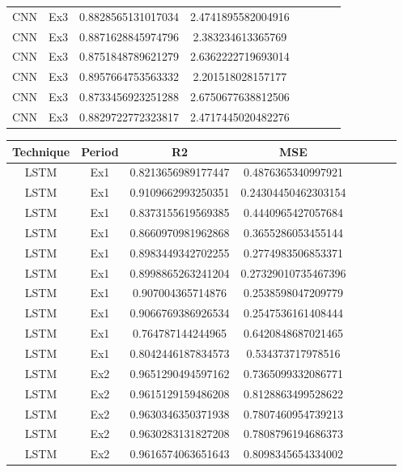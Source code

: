 \begin{appendices}
\begin{table}[H]
\begin{longtable}{ccccccll}
CNN & Ex3 & 0.8828565131017034 & 2.4741895582004916 \\
CNN & Ex3 & 0.8871628845974796 & 2.383234613365769 \\
CNN & Ex3 & 0.8751848789621279 & 2.6362222719693014 \\
CNN & Ex3 & 0.8957664753563332 & 2.201518028157177 \\
CNN & Ex3 & 0.8733456923251288 & 2.6750677638812506 \\
CNN & Ex3 & 0.8829722772323817 & 2.4717445020482276 \\ \hline
\end{longtable}
\end{table}


\thispagestyle{empty}


\begin{table}[H]
\scriptsize
\setlength\extrarowheight{3pt}
\centering
\caption{Resultados numéricos de todos os experimentos para os testes com o LSTM. Ações PETR4.SA.}
\begin{longtable}{ccccccll}
\hline
Technique & Period & R2 & MSE \\ \hline
\hline
LSTM & Ex1 & 0.8213656989177447 & 0.4876365340997921 \\
LSTM & Ex1 & 0.9109662993250351 & 0.24304450462303154 \\
LSTM & Ex1 & 0.8373155619569385 & 0.4440965427057684 \\
LSTM & Ex1 & 0.8660970981962868 & 0.3655286053455144 \\
LSTM & Ex1 & 0.8983449342702255 & 0.2774983506853371 \\
LSTM & Ex1 & 0.8998865263241204 & 0.27329010735467396 \\
LSTM & Ex1 & 0.907004365714876 & 0.2538598047209779 \\
LSTM & Ex1 & 0.9066769386926534 & 0.2547536161408444 \\
LSTM & Ex1 & 0.764787144244965 & 0.6420848687021465 \\
LSTM & Ex1 & 0.8042446187834573 & 0.534373717978516 \\
LSTM & Ex2 & 0.9651290494597162 & 0.7365099332086771 \\
LSTM & Ex2 & 0.9615129159486208 & 0.8128863499528622 \\
LSTM & Ex2 & 0.9630346350371938 & 0.7807460954739213 \\
LSTM & Ex2 & 0.9630283131827208 & 0.7808796194686373 \\
LSTM & Ex2 & 0.9616574063651643 & 0.8098345654334002 \\

\end{longtable}
\end{table}
\end{appendices}
